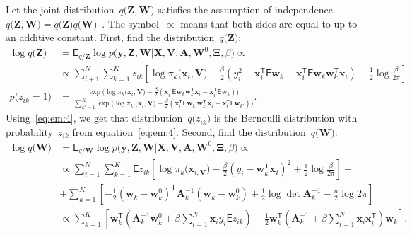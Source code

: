 \documentclass[12pt, twoside]{article}
\numberwithin{equation}{section}
\begin{document}
Let the joint distribution~$q\bigr(\mathbf{Z}, \mathbf{W}\bigr)$ satisfies the assumption of independence~$q\bigr(\mathbf{Z}, \mathbf{W}\bigr) = q\bigr(\mathbf{Z}\bigr)q\bigr(\mathbf{W}\bigr)$~\cite{bishop2006}. 
The symbol~$\propto$ means that both sides are equal to up to an additive constant.
First, find the distribution~$q\bigr(\textbf{Z}\bigr)$:
\[
\label{eq:em:4}
\begin{aligned}
\log q\bigr(\textbf{Z}\bigr) &= \mathsf{E}_{q/\textbf{Z}} \log p\bigr(\mathbf{y}, \mathbf{Z}, \mathbf{W}|\mathbf{X}, \mathbf{V}, \textbf{A}, \textbf{W}^{0}, \bm{\Xi}, \beta\bigr)  \propto\\
&\propto \sum_{i+1}^{N}\sum_{k=1}^{K}z_{ik}\left[\log\pi_{k}\bigr(\textbf{x}_{i}, \textbf{V}\bigr) - \frac{\beta}{2}\left(y_{i}^{2} -\textbf{x}_{i}^{\mathsf{T}}\mathsf{E}\textbf{w}_{k} + \textbf{x}_{i}^{\mathsf{T}}\mathsf{E}\textbf{w}_{k}\textbf{w}_{k}^{\mathsf{T}}\textbf{x}_{i}\right) + \frac{1}{2}\log\frac{\beta}{2\pi}\right]\\
p\bigr(z_{ik} = 1\bigr) &= \frac{\exp\bigr(\log\pi_{k}\bigr(\textbf{x}_{i}, \textbf{V}\bigr) - \frac{\beta}{2}\left(\textbf{x}_{i}^{\mathsf{T}}\mathsf{E}\textbf{w}_{k}\textbf{w}_{k}^{\mathsf{T}}\textbf{x}_{i} - \textbf{x}_{i}^{\mathsf{T}}\mathsf{E}\textbf{w}_{k}\right)\bigr)}{\sum_{k'=1}^{K}\exp\bigr(\log\pi_{k'}\bigr(\textbf{x}_{i}, \textbf{V}\bigr) - \frac{\beta}{2}\left(\textbf{x}_{i}^{\mathsf{T}}\mathsf{E}\textbf{w}_{k'}\textbf{w}_{k'}^{\mathsf{T}}\textbf{x}_{i} - \textbf{x}_{i}^{\mathsf{T}}\mathsf{E}\textbf{w}_{k'}\right)\bigr)}.
\end{aligned}
\]
Using~\eqref{eq:em:4}, we get that distribution~$q\bigr(z_{ik}\bigr)$ is the Bernoulli distribution with probability~$z_{ik}$ from equation~\eqref{eq:em:4}.
Second, find the distribution~$q\bigr(\textbf{W}\bigr)$:
\[
\label{eq:em:5}
\begin{aligned}
\log q\bigr(\textbf{W}\bigr) &= \mathsf{E}_{q/\textbf{W}}\log p\bigr(\mathbf{y}, \mathbf{Z}, \mathbf{W}|\mathbf{X}, \mathbf{V}, \textbf{A}, \textbf{W}^{0}, \bm{\Xi}, \beta\bigr) \propto\\
&\propto \sum_{i=1}^{N}\sum_{k=1}^{K}\mathsf{E}z_{ik}\left[\log\pi_{k}\bigr(\textbf{x}_{i, \textbf{V}}\bigr) - \frac{\beta}{2}\left(y_{i} - \textbf{w}_{k}^{\mathsf{T}}\textbf{x}_{i}\right)^{2} + \frac{1}{2}\log\frac{\beta}{2\pi}\right] + \\
&+ \sum_{k=1}^{K}\left[-\frac{1}{2}\left(\textbf{w}_{k} - \textbf{w}_{k}^{0}\right)^{\mathsf{T}}\textbf{A}_{k}^{-1}\left(\textbf{w}_{k} - \textbf{w}_{k}^{0}\right) + \frac{1}{2}\log\det\textbf{A}^{-1}_{k} - \frac{n}{2}\log2\pi\right] \\
&\propto \sum_{k=1}^{K}\left[\textbf{w}_{k}^{\mathsf{T}}\left(\textbf{A}_{k}^{-1}\textbf{w}_{k}^{0}+\beta\sum_{i=1}^{N}\textbf{x}_{i}y_{i}\mathsf{E}z_{ik}\right)-\frac{1}{2}\textbf{w}_{k}^{\mathsf{T}}\left(\textbf{A}_{k}^{-1}+\beta\sum_{i=1}^{N}\textbf{x}_{i}\textbf{x}_{i}^{\mathsf{T}}\right)\textbf{w}_{k}\right].
\end{aligned}
\]
\end{document}
